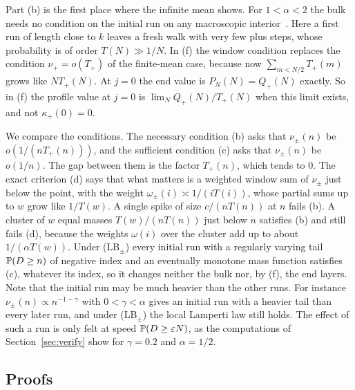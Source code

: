 Part (b) is the first place where the infinite mean shows. For $1<\alpha<2$ the bulk
needs no condition on the initial run on any macroscopic interior~\cite{pemmasaniF}.
Here a first run of length close to $k$ leaves a fresh walk with very few plus steps,
whose probability is of order $T(N)\gg1/N$. In (f) the window condition replaces the
condition $\nu_\plus=o(T_\plus)$ of the finite-mean case, because now
$\sum_{m<N/2}T_\plus(m)$ grows like $NT_\plus(N)$. At $j=0$ the end value is
$P_N(N)=Q_\plus(N)$ exactly. So in (f) the profile value at $j=0$ is
$\lim_NQ_\plus(N)/T_\plus(N)$ when this limit exists, and not $\kappa_\plus(0)=0$.

We compare the conditions. The necessary condition (b) asks that $\nu_\pm(n)$ be
$o(1/(nT_\plus(n)))$, and the sufficient condition (c) asks that $\nu_\pm(n)$ be $o(1/n)$.
The gap between them is the factor $T_\plus(n)$, which tends to $0$. The exact criterion (d)
says that what matters is a weighted window sum of $\nu_\pm$ just below the point, with the
weight $\omega_\pm(i)\asymp1/(iT(i))$, whose partial sums up to $w$ grow like $1/T(w)$. A single
spike of size $c/(nT(n))$ at $n$ fails (b). A cluster of $w$ equal masses $T(w)/(nT(n))$ just
below $n$ satisfies (b) and still fails (d), because the weights $\omega(i)$ over the cluster add
up to about $1/(\alpha T(w))$. Under (LB$_\pm$) every initial
run with a regularly varying tail $\mathbb{P}(D\ge n)$ of negative index and an eventually monotone
mass function satisfies (c), whatever its index, so it changes neither the bulk nor, by (f),
the end layers. Note that the initial run may be much heavier than the other runs. For instance
$\nu_\pm(n)\propto n^{-1-\gamma}$ with $0<\gamma<\alpha$ gives an initial run with a heavier tail
than every later run, and under (LB$_\pm$) the local Lamperti law still holds. The effect of such a run is
only felt at speed $\mathbb{P}(D\ge\varepsilon N)$, as the computations of Section~\ref{sec:verify}
show for $\gamma=0.2$ and $\alpha=1/2$.

\subsection{Proofs}

